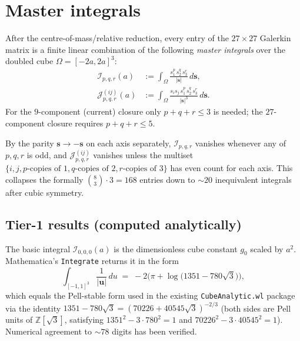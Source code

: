 \documentclass[11pt,a4paper]{article}
\newcommand{\bs}{\bm{s}}
\newcommand{\bu}{\bm{u}}
\theoremstyle{plain}
\theoremstyle{definition}
\theoremstyle{remark}
\begin{document}
\section{Master integrals}

After the centre-of-mass/relative reduction, every entry of the
$27\times 27$ Galerkin matrix is a finite linear combination of the
following \emph{master integrals} over the doubled cube
$\Omega = [-2a,2a]^{3}$:
\begin{align}
   \mathcal{I}_{p,q,r}(a) &:= \int_{\Omega}\!\frac{s_1^{p}\,s_2^{q}\,s_3^{r}}{|\bs|}\,d\bs, \label{eq:Imaster}\\
   \mathcal{J}^{(ij)}_{p,q,r}(a) &:= \int_{\Omega}\!\frac{s_i s_j\,s_1^{p}\,s_2^{q}\,s_3^{r}}{|\bs|^{3}}\,d\bs.
   \label{eq:Jmaster}
\end{align}
For the $9$-component (current) closure only $p+q+r \le 3$ is needed; the
$27$-component closure requires $p+q+r \le 5$.

By the parity $\bs \to -\bs$ on each axis separately, $\mathcal{I}_{p,q,r}$
vanishes whenever any of $p,q,r$ is odd, and $\mathcal{J}^{(ij)}_{p,q,r}$
vanishes unless the multiset $\{i,j,p\text{-copies of }1,q\text{-copies of }2,r\text{-copies of }3\}$ has even count for each axis.  This collapses
the formally $\binom{8}{3} \cdot 3 = 168$ entries down to $\sim 20$ inequivalent integrals after cubic symmetry.

\subsection{Tier-1 results (computed analytically)}\label{sec:tier1}

The basic integral $\mathcal{I}_{0,0,0}(a)$ is the dimensionless cube
constant $g_0$ scaled by $a^{2}$.  Mathematica's \texttt{Integrate}
returns it in the form
\begin{equation}
   \int_{[-1,1]^{3}}\!\frac{1}{|\bu|}\,du \;=\; -2\Big(\pi + \log\!\big(1351 - 780\sqrt{3}\big)\Big),
\end{equation}
which equals the Pell-stable form used in the existing
\texttt{CubeAnalytic.wl} package via the identity
$1351 - 780\sqrt{3} = (70226 + 40545\sqrt{3})^{-2/3}$ (both sides are Pell
units of $\mathbb{Z}[\sqrt{3}]$, satisfying $1351^{2} - 3\cdot 780^{2} = 1$
and $70226^{2} - 3\cdot 40545^{2} = 1$). Numerical agreement to $\sim\!78$ digits has been verified.
\end{document}
